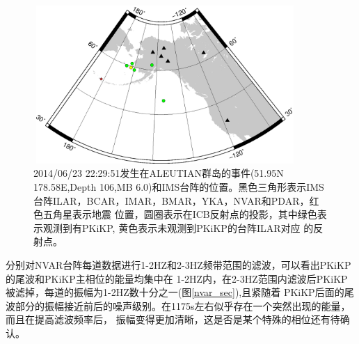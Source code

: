 \begin{figure}[!ht]
	\centering
	\includegraphics[height=6cm,width=10cm]{fig/chap3/ALAS.eps}
	\caption{2014/06/23 22:29:51发生在ALEUTIAN群岛的事件(51.95N 178.58E,Depth 106,MB%
6.0)和IMS台阵的位置。黑色三角形表示IMS台阵ILAR，BCAR，IMAR，BMAR，YKA，NVAR和PDAR，红色五角星表示地震%
位置，圆圈表示在ICB反射点的投影，其中绿色表示观测到有PKiKP, 黄色表示未观测到PKiKP的台阵ILAR对应%
的反射点。}
	\label{alas}
\end{figure}

分别对NVAR台阵每道数据进行1-2HZ和2-3HZ频带范围的滤波，可以看出PKiKP的尾波和PKiKP主相位的能量均集中在
1-2HZ内，在2-3HZ范围内滤波后PKiKP被滤掉，每道的振幅为1-2HZ数十分之一(图\ref{nvar_sec}),且紧随着
PKiKP后面的尾波部分的振幅接近前后的噪声级别。在1175s左右似乎存在一个突然出现的能量，而且在提高滤波频率后，
振幅变得更加清晰，这是否是某个特殊的相位还有待确认。

